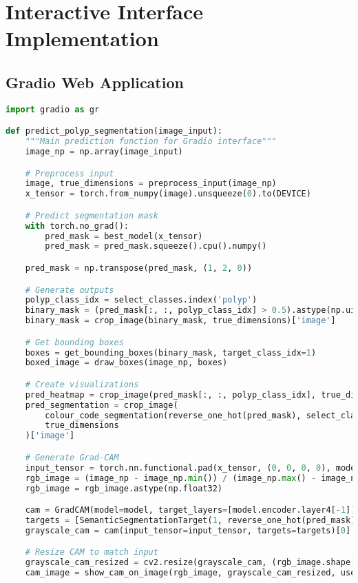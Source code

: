 \documentclass[12pt,a4paper]{report}
\begin{document}
\chapter{Interactive Interface Implementation}

\section{Gradio Web Application}
\begin{lstlisting}[language=Python, caption=Gradio Interface]
import gradio as gr

def predict_polyp_segmentation(image_input):
    """Main prediction function for Gradio interface"""
    image_np = np.array(image_input)

    # Preprocess input
    image, true_dimensions = preprocess_input(image_np)
    x_tensor = torch.from_numpy(image).unsqueeze(0).to(DEVICE)

    # Predict segmentation mask
    with torch.no_grad():
        pred_mask = best_model(x_tensor)
        pred_mask = pred_mask.squeeze().cpu().numpy()

    pred_mask = np.transpose(pred_mask, (1, 2, 0))

    # Generate outputs
    polyp_class_idx = select_classes.index('polyp')
    binary_mask = (pred_mask[:, :, polyp_class_idx] > 0.5).astype(np.uint8)
    binary_mask = crop_image(binary_mask, true_dimensions)['image']

    # Get bounding boxes
    boxes = get_bounding_boxes(binary_mask, target_class_idx=1)
    boxed_image = draw_boxes(image_np, boxes)

    # Create visualizations
    pred_heatmap = crop_image(pred_mask[:, :, polyp_class_idx], true_dimensions)['image']
    pred_segmentation = crop_image(
        colour_code_segmentation(reverse_one_hot(pred_mask), select_class_rgb_values),
        true_dimensions
    )['image']

    # Generate Grad-CAM
    input_tensor = torch.nn.functional.pad(x_tensor, (0, 0, 0, 0), mode='reflect')
    rgb_image = (image_np - image_np.min()) / (image_np.max() - image_np.min())
    rgb_image = rgb_image.astype(np.float32)

    cam = GradCAM(model=model, target_layers=[model.encoder.layer4[-1]])
    targets = [SemanticSegmentationTarget(1, reverse_one_hot(pred_mask))]
    grayscale_cam = cam(input_tensor=input_tensor, targets=targets)[0]

    # Resize CAM to match input
    grayscale_cam_resized = cv2.resize(grayscale_cam, (rgb_image.shape[1], rgb_image.shape[0]))
    cam_image = show_cam_on_image(rgb_image, grayscale_cam_resized, use_rgb=True)


\end{lstlisting}
\end{document}
